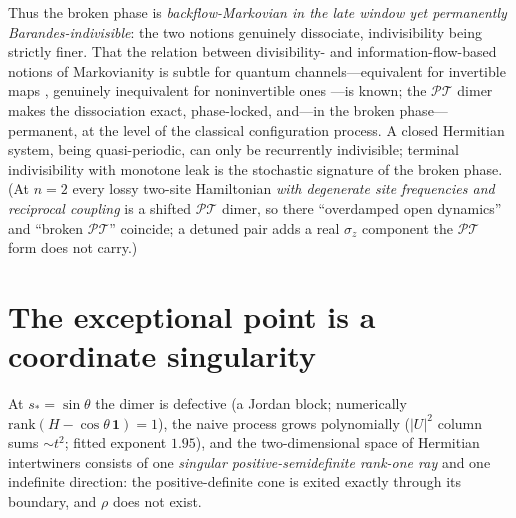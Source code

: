 \documentclass[11pt]{article}
\theoremstyle{definition}
\theoremstyle{remark}
\newcommand{\PT}{\mathcal{PT}}
\begin{document}
Thus the broken phase is \emph{backflow-Markovian in the late window
yet permanently Barandes-indivisible}:
the two notions genuinely dissociate, indivisibility being strictly finer.
That the relation between divisibility- and information-flow-based
notions of Markovianity is subtle for quantum channels---equivalent
for invertible maps \cite{ChruscinskiRS2018}, genuinely inequivalent
for noninvertible ones \cite{Rivas2022}---is known; the $\PT$ dimer
makes the dissociation exact,
phase-locked, and---in the broken phase---permanent, at the level of the
classical configuration process.
A closed Hermitian system, being quasi-periodic, can only be recurrently
indivisible; terminal indivisibility with monotone leak is the stochastic
signature of the broken phase. (At $n=2$ every lossy two-site Hamiltonian
\emph{with degenerate site frequencies and reciprocal coupling} is a shifted $\PT$ dimer, so
there ``overdamped open dynamics'' and ``broken
$\PT$'' coincide; a detuned pair adds a real $\sigma_z$ component the
$\PT$ form does not carry.)

\section{The exceptional point is a coordinate singularity}
\label{sec:ep}

At $s_*=\sin\theta$ the dimer is defective (a Jordan block; numerically
$\mathrm{rank}(H-\cos\theta\,\mathbf 1)=1$), the naive process grows
polynomially ($|U|^2$ column sums $\sim t^{2}$; fitted exponent $1.95$),
and the two-dimensional space of Hermitian intertwiners consists of one
\emph{singular positive-semidefinite rank-one ray} and one indefinite
direction: the positive-definite cone is exited exactly through its
boundary, and $\rho$ does not exist.
\end{document}
